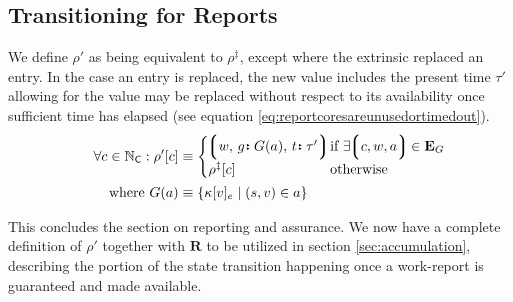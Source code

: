 \subsection{Transitioning for Reports}

We define $\rho'$ as being equivalent to $\rho^\ddagger$, except where the extrinsic replaced an entry. In the case an entry is replaced, the new value includes the present time $\tau'$ allowing for the value may be replaced without respect to its availability once sufficient time has elapsed (see equation \ref{eq:reportcoresareunusedortimedout}).
\begin{equation}
\begin{aligned}
    \forall c \in \N_\mathsf{C} : \rho'[c] &\equiv \begin{cases}
      \tup{w\ts\is{g}{G(a)}\ts\is{t}{\tau'}}\!\!\!\!\! &\when \exists \tup{c, w, a} \in \mathbf{E}_G \\
      \rho^\ddagger[c] &\otherwise
    \end{cases}\!\!\!\!\!\!\!\!\! \\
    \where G(a) &\equiv \{\kappa[v]_e \mid (s, v) \in a \}
\end{aligned}
\end{equation}

This concludes the section on reporting and assurance. We now have a complete definition of $\rho'$ together with $\mathbf{R}$ to be utilized in section \ref{sec:accumulation}, describing the portion of the state transition happening once a work-report is guaranteed and made available.
